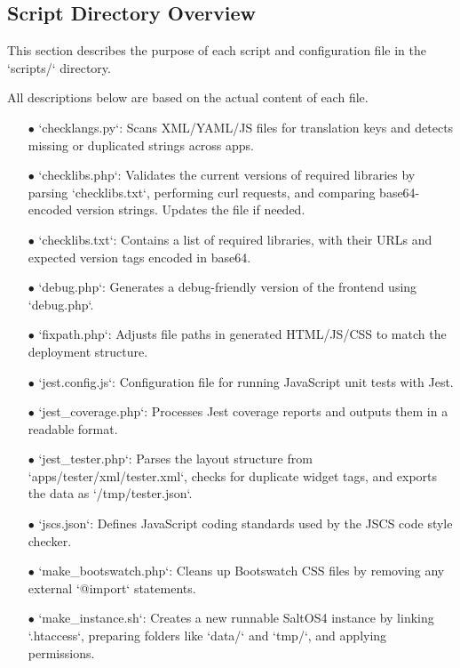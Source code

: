 \documentclass[a4paper]{article}
\begin{document}
\hypertarget{toc68}{}
\subsection{Script Directory Overview}

This section describes the purpose of each script and configuration file in the `scripts/` directory.

All descriptions below are based on the actual content of each file.

\begin{itemize}
\item[\color{myblue}$\bullet$] `checklangs.py`: Scans XML/YAML/JS files for translation keys and detects missing or duplicated strings across apps.
\item[\color{myblue}$\bullet$] `checklibs.php`: Validates the current versions of required libraries by parsing `checklibs.txt`, performing curl requests, and comparing base64-encoded version strings. Updates the file if needed.
\item[\color{myblue}$\bullet$] `checklibs.txt`: Contains a list of required libraries, with their URLs and expected version tags encoded in base64.
\item[\color{myblue}$\bullet$] `debug.php`: Generates a debug-friendly version of the frontend using `debug.php`.
\item[\color{myblue}$\bullet$] `fixpath.php`: Adjusts file paths in generated HTML/JS/CSS to match the deployment structure.
\item[\color{myblue}$\bullet$] `jest.config.js`: Configuration file for running JavaScript unit tests with Jest.
\item[\color{myblue}$\bullet$] `jest\_coverage.php`: Processes Jest coverage reports and outputs them in a readable format.
\item[\color{myblue}$\bullet$] `jest\_tester.php`: Parses the layout structure from `apps/tester/xml/tester.xml`, checks for duplicate widget tags, and exports the data as `/tmp/tester.json`.
\item[\color{myblue}$\bullet$] `jscs.json`: Defines JavaScript coding standards used by the JSCS code style checker.
\item[\color{myblue}$\bullet$] `make\_bootswatch.php`: Cleans up Bootswatch CSS files by removing any external `@import` statements.
\item[\color{myblue}$\bullet$] `make\_instance.sh`: Creates a new runnable SaltOS4 instance by linking `.htaccess`, preparing folders like `data/` and `tmp/`, and applying permissions.

\end{itemize}
\end{document}

